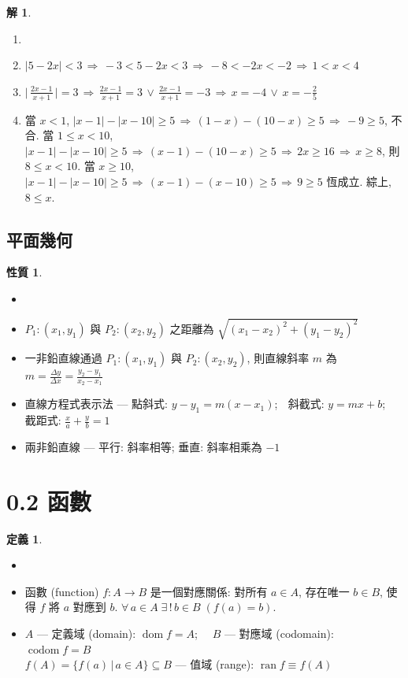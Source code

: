 \documentclass[12pt]{extarticle}
\newcommand{\ds}{\displaystyle}
\newcommand{\ie}{\,\Longrightarrow\,}
\DeclareMathOperator*{\dom}{dom}
\DeclareMathOperator*{\codom}{codom}
\DeclareMathOperator*{\ran}{ran}
\theoremstyle{definition}
\newtheorem*{dfn}{定義}
\newtheorem*{prp}{性質}
\newtheorem*{sol}{解}
\begin{document}
\begin{sol}
  \begin{enumerate}\setlength\itemsep{0em}
    \item[]
    \item $\ds |5 - 2x| < 3 \ie -3 < 5 - 2x < 3 \ie -8 < -2x < -2 \ie 1 < x < 4$
    \item $\ds \Big|\,\frac{2 x - 1}{x + 1}\,\Big| = 3 \ie \frac{2 x - 1}{x + 1} = 3\,\vee\,\frac{2 x - 1}{x + 1} = -3 \ie x = -4 \,\vee\, x = -\frac{2}{5}$
    \item 當 $x < 1$, $\ds |x - 1| - |x - 10|\geqslant 5 \ie (1 - x) - (10 - x)\geqslant 5 \ie -9 \geqslant 5$, 不合. 當 $1\leqslant x < 10$, $\ds |x - 1| - |x - 10|\geqslant 5 \ie (x - 1) - (10 - x)\geqslant 5 \ie 2 x\geqslant 16 \ie x\geqslant 8$, 則 $8\leqslant x < 10$. 當 $x\geqslant 10$, $\ds |x - 1| - |x - 10|\geqslant 5 \ie (x - 1) - (x - 10)\geqslant 5 \ie 9\geqslant 5$ 恆成立. 綜上, $8\leqslant x$. 
  \end{enumerate}
\end{sol}

\subsection*{平面幾何}

\begin{prp}
  \begin{itemize}\setlength\itemsep{0em}
    \item[]
    \item $P_1: (x_1, y_1)$ 與 $P_2: (x_2, y_2)$ 之距離為 $\ds \sqrt{(x_1 - x_2)^2 + (y_1 - y_2)^2}$
    \item 一非鉛直線通過 $P_1: (x_1, y_1)$ 與 $P_2: (x_2, y_2)$, 則直線斜率 $m$ 為 $\ds m = \frac{\Delta y}{\Delta x} = \frac{y_2 - y_1}{x_2 - x_1}$
    \item 直線方程式表示法 --- 點斜式: $\ds y - y_1 = m(x - x_1)$; $\;$ 斜截式: $\ds y = m x + b$; $\;$ 截距式: $\ds \frac{x}{a} + \frac{y}{b} = 1$
    \item 兩非鉛直線 --- 平行:  斜率相等; 垂直:  斜率相乘為 $-1$
  \end{itemize}
\end{prp}

\section*{0.2 函數}

\begin{dfn}
  \begin{itemize}\setlength\itemsep{0em}
    \item[]
    \item 函數 (function) $f:A\to B$ 是一個對應關係: 對所有 $a\in A$, 存在唯一 $b\in B$, 使得 $f$ 將 $a$ 對應到 $b$. $\ds\forall\,a\in A\;\exists\,!\,b\in B\;(f(a) = b)$.
    \item $A$ --- 定義域 (domain): $\dom f = A$; $\quad B$ --- 對應域 (codomain): $\codom f = B$ \\
          $f(A) = \{f(a)\,|\,a\in A\}\subseteq B$ --- 值域 (range): $\ran f \equiv f(A)$      
  \end{itemize}
\end{dfn}
\end{document}

